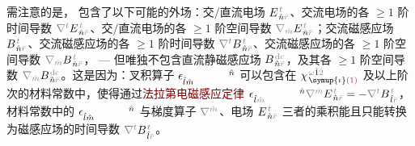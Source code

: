 需注意的是， 包含了以下可能的外场：交/直流电场 $E^{\;\!\mathcolor{gray}{t}}_{\;\! \hat{n} \mathcolor{gray}{\bar{r}}}$、交流电场的各 $\geq 1$ 阶时间导数 $\mathcolor{gray}{\nabla^t} E^{\;\!\mathcolor{gray}{t}}_{\;\! \hat{n} \mathcolor{gray}{\bar{r}}}$、交/直流电场的各 $\geq 1$ 阶空间导数 $\mathcolor{gray}{\nabla_{\hat{m}}} E^{\;\!\mathcolor{gray}{t}}_{\;\! \hat{n} \mathcolor{gray}{\bar{r}}}$；交流磁感应场 $B^{\;\!\mathcolor{gray}{t}}_{\;\! \hat{n} \mathcolor{gray}{\bar{r}}}$、交流磁感应场的各 $\geq 1$ 阶时间导数 $\mathcolor{gray}{\nabla^t} B^{\;\!\mathcolor{gray}{t}}_{\;\! \hat{n} \mathcolor{gray}{\bar{r}}}$、交流磁感应场的各 $\geq 1$ 阶空间导数 $\mathcolor{gray}{\nabla_{\hat{m}}} B^{\;\!\mathcolor{gray}{t}}_{\;\! \hat{n} \mathcolor{gray}{\bar{r}}}$， ---  但唯独不包含直流静磁感应场 $B^{\;\!\mathcolor{gray}{\text{dc}}}_{\;\! \hat{n} \mathcolor{gray}{\bar{r}}}$，及其各 $\geq 1$ 阶空间导数 $\mathcolor{gray}{\nabla_{\hat{m}}} B^{\;\!\mathcolor{gray}{\text{dc}}}_{\;\! \hat{n} \mathcolor{gray}{\bar{r}}}$。这是因为：叉积算子 $\epsilon^{\hphantom{\symup{\iota}\hat{m}}\hat{n}}_{\hat{l}\hat{m}}$ 可以包含在 $\chi^{\;\! \mathcolor{gray}{\omega} \hat{1} \mathcolor{gray}{\hat{2}}}_{\;\! \symup{\iota} \textcolor{Maroon}{(1)}}$ 及以上阶次的材料常数中，使得通过\textcolor{Maroon}{法拉第电磁感应定律} $\epsilon^{\hphantom{\symup{\iota}\hat{m}}\hat{n}}_{\hat{l}\mathcolor{gray}{\hat{m}}} \mathcolor{gray}{\nabla^{\hat{m}}} E^{\;\!\mathcolor{gray}{t}}_{\;\! \hat{n} \mathcolor{gray}{\bar{r}}} = - \mathcolor{gray}{\nabla^t} B^{\;\!\mathcolor{gray}{t}}_{\;\! \hat{l} \mathcolor{gray}{\bar{r}}}$，材料常数中的 $\epsilon^{\hphantom{\symup{\iota}\hat{m}}\hat{n}}_{\hat{l}\hat{m}}$ 与梯度算子 $\mathcolor{gray}{\nabla^{\hat{m}}}$、电场 $E^{\;\!\mathcolor{gray}{t}}_{\;\! \hat{n} \mathcolor{gray}{\bar{r}}}$ 三者的乘积能且只能转换为磁感应场的时间导数 $\mathcolor{gray}{\nabla^t} B^{\;\!\mathcolor{gray}{t}}_{\;\! \hat{l} \mathcolor{gray}{\bar{r}}}$。

